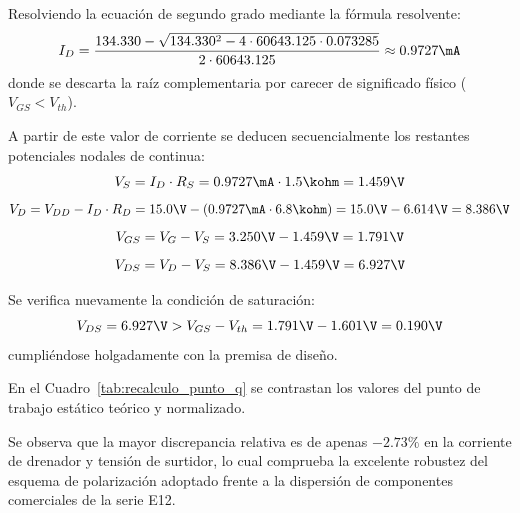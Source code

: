 Resolviendo la ecuación de segundo grado mediante la fórmula resolvente:
\begin{equation}
  I_D = \frac{134.330 - \sqrt{134.330^2 - 4 \cdot 60643.125 \cdot 0.073285}}{2 \cdot 60643.125} \approx 0.9727\mA
  \label{eq:ID_norm_val}
\end{equation}
donde se descarta la raíz complementaria por carecer de significado físico ($V_{GS} < V_{th}$).

A partir de este valor de corriente se deducen secuencialmente los restantes potenciales nodales de continua:
\begin{equation}
  V_S = I_D \cdot R_S = 0.9727\mA \cdot 1.5\kohm = 1.459\V
  \label{eq:VS_norm_val}
\end{equation}
\begin{equation}
  V_D = V_{DD} - I_D \cdot R_D = 15.0\V - (0.9727\mA \cdot 6.8\kohm) = 15.0\V - 6.614\V = 8.386\V
  \label{eq:VD_norm_val}
\end{equation}
\begin{equation}
  V_{GS} = V_G - V_S = 3.250\V - 1.459\V = 1.791\V
  \label{eq:VGS_norm_val}
\end{equation}
\begin{equation}
  V_{DS} = V_D - V_S = 8.386\V - 1.459\V = 6.927\V
  \label{eq:VDS_norm_val}
\end{equation}

Se verifica nuevamente la condición de saturación:
\begin{equation}
  V_{DS} = 6.927\V > V_{GS} - V_{th} = 1.791\V - 1.601\V = 0.190\V
\end{equation}
cumpliéndose holgadamente con la premisa de diseño.

En el Cuadro~\ref{tab:recalculo_punto_q} se contrastan los valores del punto de trabajo estático teórico y normalizado.

\begin{table}[!ht]
  \centering
  \caption{Comparación entre el punto de reposo analítico teórico y el obtenido con componentes normalizados.}
  \label{tab:recalculo_punto_q}
\end{table}

Se observa que la mayor discrepancia relativa es de apenas $-2.73\%$ en la corriente de drenador y tensión de surtidor,
lo cual comprueba la excelente robustez del esquema de polarización adoptado frente a la dispersión de componentes
comerciales de la serie E12.
